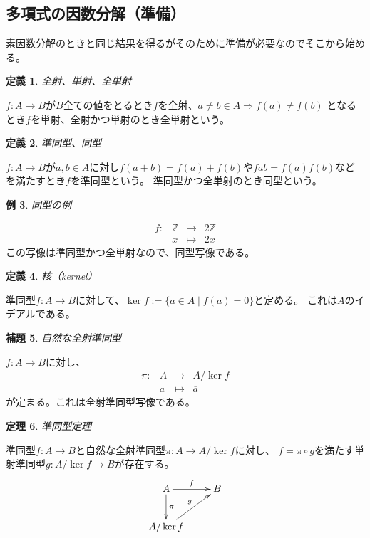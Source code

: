 \documentclass{jsarticle}
\newtheorem{definition}{定義}
\newtheorem{thm}[definition]{定理}
\newtheorem{lem}[definition]{補題}
\newtheorem{exm}[definition]{例}
\begin{document}
\subsection{多項式の因数分解（準備）}
素因数分解のときと同じ結果を得るがそのために準備が必要なのでそこから始める。
\begin{definition}
    全射、単射、全単射
\end{definition}
$f:A\longrightarrow B$が$B$全ての値をとるとき$f$を全射、$a\neq b \in A\Rightarrow f(a)\neq f(b)$
となるとき$f$を単射、全射かつ単射のとき全単射という。
\begin{definition}
    準同型、同型
\end{definition}
$f:A\longrightarrow B$が$a,b\in A$に対し$f(a+b)=f(a)+f(b)$や$f{ab}=f(a)f(b)$などを満たすとき$f$を準同型という。
準同型かつ全単射のとき同型という。
\begin{exm}
    同型の例
\end{exm}
\begin{equation*}
    \begin{array}{rccc}
        f\colon &\mathbb{Z}                    &\longrightarrow& 2\mathbb{Z}                     \\
                & x                    & \longmapsto   & 2x
    \end{array}
\end{equation*}
この写像は準同型かつ全単射なので、同型写像である。
\begin{definition}
    核（kernel）
\end{definition}
準同型$f:A\longrightarrow B$に対して、$\ker{f}:=\{a\in A\mid f(a)=0\}$と定める。
これは$A$のイデアルである。
\begin{lem}
    自然な全射準同型
\end{lem}
$f:A\longrightarrow B$に対し、
\begin{equation*}
    \begin{array}{rccc}
        \pi\colon &A &\longrightarrow & A/\ker{f}\\
                  &a & \longmapsto    &\overline{a} 
    \end{array}
\end{equation*}
が定まる。これは全射準同型写像である。
\begin{thm}\label{thm1}
    準同型定理
\end{thm}
準同型$f:A\longrightarrow B$と自然な全射準同型$\pi\colon A \longrightarrow  A/\ker{f}$に対し、
$f=\pi\circ g$を満たす単射準同型$g\colon A/\ker{f}\longrightarrow B$が存在する。
\[
    \xymatrix{
        A \ar[r]^-f \ar[d]^-\pi & B\\
        A/\ker{f}\ar[ru]^-g
    }
\]
\end{document}
